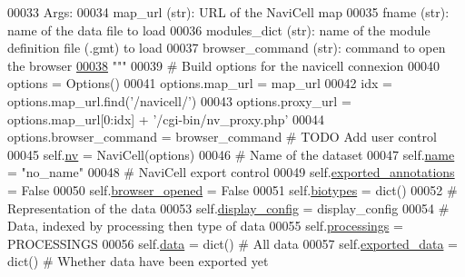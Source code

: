 \begin{DoxyCode}
00033 \textcolor{stringliteral}{        Args:}
00034 \textcolor{stringliteral}{            map\_url (str): URL of the NaviCell map}
00035 \textcolor{stringliteral}{            fname (str): name of the data file to load}
00036 \textcolor{stringliteral}{            modules\_dict (str): name of the module definition file (.gmt) to load
      }
00037 \textcolor{stringliteral}{            browser\_command (str): command to open the browser}
\hypertarget{navicom_8py_source_l00038}{}\hyperlink{classnavicom_1_1navicom_1_1NaviCom_ae6133fe7ec63cf5643c1794f4f8e2349}{00038} \textcolor{stringliteral}{        """}
00039         \textcolor{comment}{# Build options for the navicell connexion}
00040         options = Options()
00041         options.map\_url = map\_url
00042         idx = options.map\_url.find(\textcolor{stringliteral}{'/navicell/'})
00043         options.proxy\_url = options.map\_url[0:idx] + \textcolor{stringliteral}{'/cgi-bin/nv\_proxy.php'}
00044         options.browser\_command = browser\_command \textcolor{comment}{# TODO Add user control}
00045         self.\hyperlink{classnavicom_1_1navicom_1_1NaviCom_af740fe52f9f3cfc076ae88ca696bd05e}{nv} = NaviCell(options)
00046         \textcolor{comment}{# Name of the dataset}
00047         self.\hyperlink{classnavicom_1_1navicom_1_1NaviCom_a950e5ebf199edea40d55c506b8aaf134}{name} = \textcolor{stringliteral}{"no\_name"}
00048         \textcolor{comment}{# NaviCell export control}
00049         self.\hyperlink{classnavicom_1_1navicom_1_1NaviCom_aff54ed91d1f335cea31829f59d4efb81}{exported_annotations} = \textcolor{keyword}{False}
00050         self.\hyperlink{classnavicom_1_1navicom_1_1NaviCom_a32c1346193b73ea8558dd0318ae6932c}{browser_opened} = \textcolor{keyword}{False}
00051         self.\hyperlink{classnavicom_1_1navicom_1_1NaviCom_a48c57d5aca173ba7167dbc51501fb1ac}{biotypes} = dict()
00052         \textcolor{comment}{# Representation of the data}
00053         self.\hyperlink{classnavicom_1_1navicom_1_1NaviCom_a56628d774db59cb8b06af3801fb6306c}{display_config} = display\_config
00054         \textcolor{comment}{# Data, indexed by processing then type of data}
00055         self.\hyperlink{classnavicom_1_1navicom_1_1NaviCom_a5a255d56e997ddcc653d8f06c741ea13}{processings} = PROCESSINGS
00056         self.\hyperlink{classnavicom_1_1navicom_1_1NaviCom_aa1abff245573ed8406c6bddb4596f093}{data} = dict() \textcolor{comment}{# All data}
00057         self.\hyperlink{classnavicom_1_1navicom_1_1NaviCom_a5995e07de24daa015b8b44b1ae0cada7}{exported_data} = dict() \textcolor{comment}{# Whether data have been exported yet}

\end{DoxyCode}
